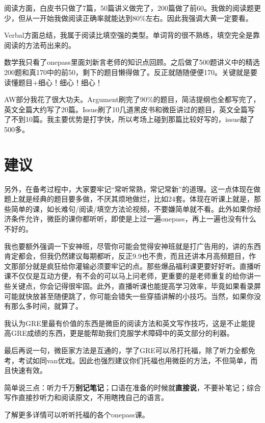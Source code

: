\documentclass[cn,plain]{./src/qyxfbook}
\begin{document}
阅读方面，白皮书只做了7篇，50篇讲义做完了，200篇做了前60。我做的阅读题更少，但从一开始我做阅读正确率就能达到80\%左右。因此我强调大黄一定要看。

Verbal方面总结，我属于阅读比填空强的类型。单词背的很不熟练，填空完全是靠阅读的方法苟出来的。

数学我只看了onepass里面刘新言老师的知识点回顾。之后做了500题讲义中的精选200题和真170中的前50，剩下的题目懒得做了。反正就随随便便170。关键就是要读懂题目+细心！细心！细心！

AW部分我花了很大功夫。Argument刷完了90\%的题目，简洁提纲也全都写完了，英文全篇大约写了20篇。Issue刷了10几道黑皮书和微臣讲过的题目，英文全篇写了不到10篇。我主要优势是打字快，所以考场上碰到那篇比较好写的，issue敲了500多。

\section{建议}
另外，在备考过程中，大家要牢记``常听常熟，常记常新''的道理。这一点体现在做题上就是经典的题目要多做，不厌其烦地做烂，比如24套。体现在听课上就是，那些简单的课，如长难句/阅读/填空方法论视频，不要嫌简单就不看。此外如果你经济条件允许，微臣的课你都听听，即使是上过一遍onepass，再上一遍也没有什么不好的。

我也要额外强调一下安神班，尽管你可能会觉得安神班就是打广告用的，讲的东西肯定都会，但我仍然建议每期都听，反正9.9也不贵，而且还讲本月高频题目，作文那部分就是疯狂给你灌输必须要牢记的点。那些爆品福利课更要好好听。直播听课不仅仅是互动方便，有不会的可以马上问老师，更重要的是老师重复的给你讲一些关键点，你会记得很牢固。此外，直播听课也能提高学习效率，毕竟如果看录屏可能就快放甚至随便跳了，你可能会错失一些穿插讲解的小技巧。当然，如果你没有那么多时间，就算了。

我认为GRE里最有价值的东西是微臣的阅读方法和英文写作技巧，这是不止能提高GRE成绩的东西，更是能帮助我们克服学术障碍中的英文部分的利器。

最后再说一句，微臣家方法是互通的，学了GRE可以吊打托福，除了听力全都免考，考试如同van优戏。因此也强烈建议你们托福也用微臣的方法，不但简单，而且快速有效。

简单说三点：听力千万\textbf{别记笔记}；口语在准备的时候就\textbf{直接说}，不要补笔记；综合写作直接抄听力和阅读原文，不用瞎拽自己的语言。

了解更多详情可以听听托福的各个onepass课。

\begin{center}\Huge\heiti
{}
\end{center}
\end{document}

